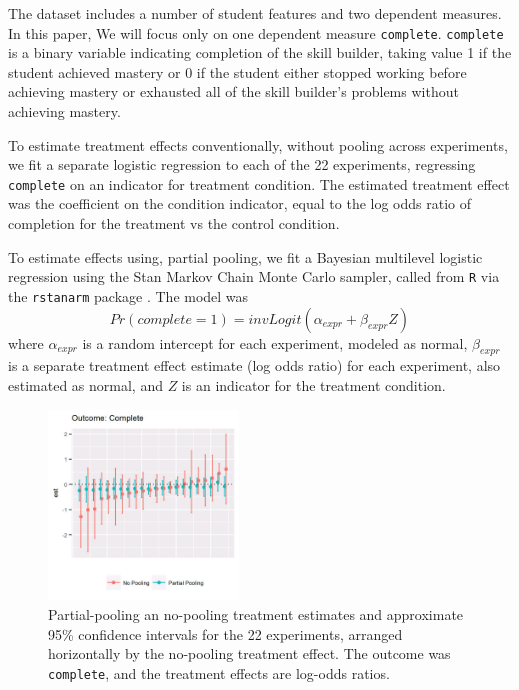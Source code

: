 \documentclass{edm_template}
\begin{document}
The dataset includes a number of student features and two dependent measures. In this paper, We will focus only on one dependent measure \texttt{complete}.
\texttt{complete} is a binary variable indicating completion of the skill builder, taking value 1 if the student achieved mastery or 0 if the student either stopped working before achieving mastery or exhausted all of the skill builder's problems without achieving mastery. 

To estimate treatment effects conventionally, without pooling across experiments, we fit a separate logistic regression to each of the 22 experiments, regressing \texttt{complete} on an indicator for treatment condition.
The estimated treatment effect was the coefficient on the condition indicator, equal to the log odds ratio of completion for the treatment vs the control condition.

To estimate effects using, partial pooling, we fit a Bayesian multilevel logistic regression using the Stan Markov Chain Monte Carlo sampler, called from \texttt{R} \cite{rcite} via the \texttt{rstanarm} package \cite{rstanarm}. 
The model was 
\begin{equation*}
Pr(complete=1)=invLogit\left(\alpha_{expr}+\beta_{expr}Z\right)
\end{equation*}
where $\alpha_{expr}$ is a random intercept for each experiment, modeled as normal, $\beta_{expr}$ is a separate treatment effect estimate (log odds ratio) for each experiment, also estimated as normal, and $Z$ is an indicator for the treatment condition.

\begin{figure}
\centering
\includegraphics[width=0.45\textwidth]{completeEst1.jpg}
\caption{Partial-pooling an no-pooling treatment estimates and approximate 95\% confidence intervals for the 22 experiments, arranged horizontally by the no-pooling treatment effect. The outcome was \texttt{complete}, and the treatment effects are log-odds ratios.}
\label{fig:estimates}
\end{figure}
\end{document}
